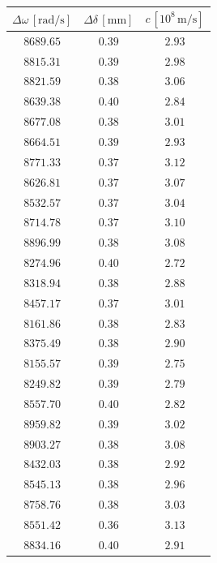 \documentclass[]{article}
\begin{document}
    \begin{table}
        \centering
        \begin{tabular}{||c|c|c||}
            \hline
            $\Delta \omega \,[\text{rad/s}]$ & $\Delta \delta \,[\text{mm}]$ & $c \,[10^8 \,\text{m/s}]$ \\
            \hline\hline
            $8689.65$ & $0.39$ & $2.93$ \\\hline
            $8815.31$ & $0.39$ & $2.98$ \\\hline
            $8821.59$ & $0.38$ & $3.06$ \\\hline
            $8639.38$ & $0.40$ & $2.84$ \\\hline
            $8677.08$ & $0.38$ & $3.01$ \\\hline
            $8664.51$ & $0.39$ & $2.93$ \\\hline
            $8771.33$ & $0.37$ & $3.12$ \\\hline
            $8626.81$ & $0.37$ & $3.07$ \\\hline
            $8532.57$ & $0.37$ & $3.04$ \\\hline
            $8714.78$ & $0.37$ & $3.10$ \\\hline
            $8896.99$ & $0.38$ & $3.08$ \\\hline
            $8274.96$ & $0.40$ & $2.72$ \\\hline
            $8318.94$ & $0.38$ & $2.88$ \\\hline
            $8457.17$ & $0.37$ & $3.01$ \\\hline
            $8161.86$ & $0.38$ & $2.83$ \\\hline
            $8375.49$ & $0.38$ & $2.90$ \\\hline
            $8155.57$ & $0.39$ & $2.75$ \\\hline
            $8249.82$ & $0.39$ & $2.79$ \\\hline
            $8557.70$ & $0.40$ & $2.82$ \\\hline
            $8959.82$ & $0.39$ & $3.02$ \\\hline
            $8903.27$ & $0.38$ & $3.08$ \\\hline
            $8432.03$ & $0.38$ & $2.92$ \\\hline
            $8545.13$ & $0.38$ & $2.96$ \\\hline
            $8758.76$ & $0.38$ & $3.03$ \\\hline
            $8551.42$ & $0.36$ & $3.13$ \\\hline
            $8834.16$ & $0.40$ & $2.91$ \\\hline

\end{tabular}
\end{table}
\end{document}
